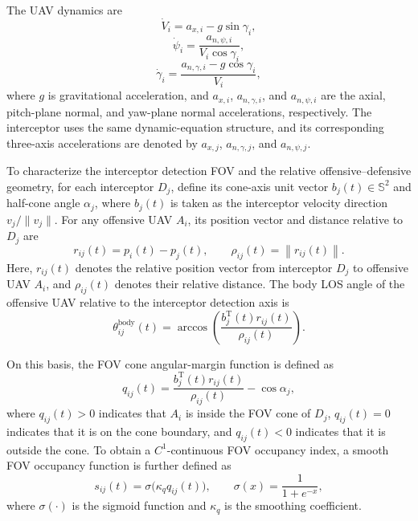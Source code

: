 \documentclass{cja}
\begin{document}
The UAV dynamics are
\begin{equation}
\dot V_i=a_{x,i}-g\sin\gamma_i,
\label{eq:dyn-V}
\end{equation}
\begin{equation}
\dot\psi_i=\frac{a_{n,\psi,i}}{V_i\cos\gamma_i},
\label{eq:dyn-psi}
\end{equation}
\begin{equation}
\dot\gamma_i=\frac{a_{n,\gamma,i}-g\cos\gamma_i}{V_i},
\label{eq:dyn-gamma}
\end{equation}
where $g$ is gravitational acceleration, and $a_{x,i}$, $a_{n,\gamma,i}$, and $a_{n,\psi,i}$ are the axial, pitch-plane normal, and yaw-plane normal accelerations, respectively. The interceptor uses the same dynamic-equation structure, and its corresponding three-axis accelerations are denoted by $a_{x,j}$, $a_{n,\gamma,j}$, and $a_{n,\psi,j}$.

To characterize the interceptor detection FOV and the relative offensive--defensive geometry, for each interceptor $D_j$, define its cone-axis unit vector $b_j(t)\in\mathbb S^2$ and half-cone angle $\alpha_j$, where $b_j(t)$ is taken as the interceptor velocity direction $v_j/\|v_j\|$. For any offensive UAV $A_i$, its position vector and distance relative to $D_j$ are
\begin{equation}
r_{ij}(t)=p_i(t)-p_j(t),\qquad
\rho_{ij}(t)=\left\|r_{ij}(t)\right\|.
\end{equation}
Here, $r_{ij}(t)$ denotes the relative position vector from interceptor $D_j$ to offensive UAV $A_i$, and $\rho_{ij}(t)$ denotes their relative distance. The body LOS angle of the offensive UAV relative to the interceptor detection axis is
\begin{equation}
\theta_{ij}^{\mathrm{body}}(t)
=
\arccos
\left(
\frac{b_j^{\mathrm T}(t)r_{ij}(t)}
{\rho_{ij}(t)}
\right).
\end{equation}

On this basis, the FOV cone angular-margin function is defined as
\begin{equation}
q_{ij}(t)
=
\frac{b_j^{\mathrm T}(t)r_{ij}(t)}
{\rho_{ij}(t)}
-\cos\alpha_j ,
\label{eq:qij-def}
\end{equation}
where $q_{ij}(t)>0$ indicates that $A_i$ is inside the FOV cone of $D_j$, $q_{ij}(t)=0$ indicates that it is on the cone boundary, and $q_{ij}(t)<0$ indicates that it is outside the cone. To obtain a $C^1$-continuous FOV occupancy index, a smooth FOV occupancy function is further defined as
\begin{equation}
s_{ij}(t)
=
\sigma\!\bigl(\kappa_q q_{ij}(t)\bigr),\qquad
\sigma(x)=\frac{1}{1+e^{-x}},
\label{eq:sij-def}
\end{equation}
where $\sigma(\cdot)$ is the sigmoid function and $\kappa_q$ is the smoothing coefficient.
\end{document}
